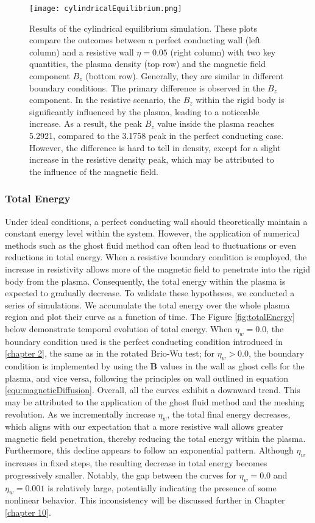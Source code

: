\begin{figure}[H]
	\centering
	\texttt{[image: cylindricalEquilibrium.png]}
	\caption[Result of cylindrical equilibrium]{Results of the cylindrical equilibrium simulation. These plots compare the outcomes between a perfect conducting wall (left column) and a resistive wall $\eta=0.05$ (right column) with two key quantities, the plasma density (top row) and the magnetic field component $B_z$ (bottom row). Generally, they are similar in different boundary conditions. The primary difference is observed in the $B_z$ component. In the resistive scenario, the $B_z$ within the rigid body is significantly influenced by the plasma, leading to a noticeable increase. As a result, the peak $B_z$ value inside the plasma reaches 5.2921, compared to the 3.1758 peak in the perfect conducting case. However, the difference is hard to tell in density, except for a slight increase in the resistive density peak, which may be attributed to the influence of the magnetic field.}
	\label{fig:cylindricalEquilibrium}
\end{figure}

\subsubsection*{Total Energy}
Under ideal conditions, a perfect conducting wall should theoretically maintain a constant energy level within the system. However, the application of numerical methods such as the ghost fluid method can often lead to fluctuations or even reductions in total energy. When a resistive boundary condition is employed, the increase in resistivity allows more of the magnetic field to penetrate into the rigid body from the plasma. Consequently, the total energy within the plasma is expected to gradually decrease. To validate these hypotheses, we conducted a series of simulations. We accumulate the total energy over the whole plasma region and plot their curve as a function of time. The Figure \ref{fig:totalEnergy} below demonstrate temporal evolution of total energy. When $\eta_w=0.0$, the boundary condition used is the perfect conducting condition introduced in \ref{chapter 2}, the same as in the rotated Brio-Wu test; for $\eta_w>0.0$, the boundary condition is implemented by using the $\mathbf{B}$ values in the wall as ghost cells for the plasma, and vice versa, following the principles on wall outlined in equation \ref{equ:magneticDiffusion}. Overall, all the curves exhibit a downward trend. This may be attributed to the application of the ghost fluid method and the meshing revolution. As we incrementally increase $\eta_w$, the total final energy decreases, which aligns with our expectation that a more resistive wall allows greater magnetic field penetration, thereby reducing the total energy within the plasma. Furthermore, this decline appears to follow an exponential pattern. Although $\eta_w$ increases in fixed steps, the resulting decrease in total energy becomes progressively smaller. Notably, the gap between the curves for $\eta_w=0.0$ and $\eta_w=0.001$ is relatively large, potentially indicating the presence of some nonlinear behavior. This inconsistency will be discussed further in Chapter \ref{chapter 10}.


